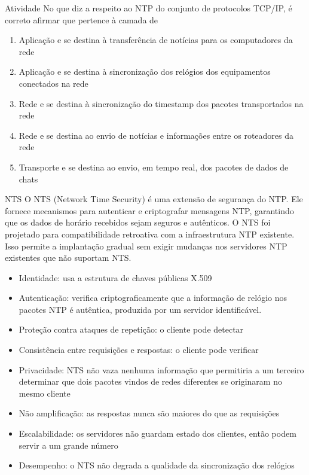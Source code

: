 \documentclass{if-beamer}
\begin{document}
	\begin{frame}
	\begin{block}{Atividade}
	No que diz a respeito ao NTP do conjunto de protocolos TCP/IP, é correto afirmar que pertence à camada de

	
	\begin{enumerate}
		\item Aplicação e se destina à transferência de notícias para os computadores da rede
		\item Aplicação e se destina à sincronização dos relógios dos equipamentos conectados na rede
		\item Rede e se destina à sincronização do timestamp dos pacotes transportados na rede
		\item Rede e se destina ao envio de notícias e informações entre os roteadores da rede
		\item Transporte e se destina ao envio, em tempo real, dos pacotes de dados de chats
	
	\end{enumerate}
	
	\end{block}
	\end{frame}
	\begin{frame}[allowframebreaks]{NTS}
	O NTS (Network Time Security) é uma extensão de segurança do NTP. Ele fornece mecanismos para autenticar e criptografar mensagens NTP, garantindo que os dados de horário recebidos sejam seguros e autênticos. O NTS foi projetado para compatibilidade retroativa com a infraestrutura NTP existente. Isso permite a implantação gradual sem exigir mudanças nos servidores NTP existentes que não suportam NTS. 
	\framebreak
	\begin{itemize}
		\item Identidade: usa a estrutura de chaves públicas X.509
		\item Autenticação: verifica criptograficamente que a informação de relógio nos
pacotes NTP é autêntica, produzida por um servidor identificável.
\item Proteção contra ataques de repetição: o cliente pode detectar
\item Consistência entre requisições e respostas: o cliente pode verificar
\end{itemize}
\framebreak
\begin{itemize}
\item Privacidade: NTS não vaza nenhuma informação que permitiria a um terceiro
determinar que dois pacotes vindos de redes diferentes se originaram no mesmo
cliente
\item Não amplificação: as respostas nunca são maiores do que as requisições
\item Escalabilidade: os servidores não guardam estado dos clientes, então podem
servir a um grande número
\item Desempenho: o NTS não degrada a qualidade da sincronização dos relógios
\end{itemize}
	\end{frame}
	
\end{document}
